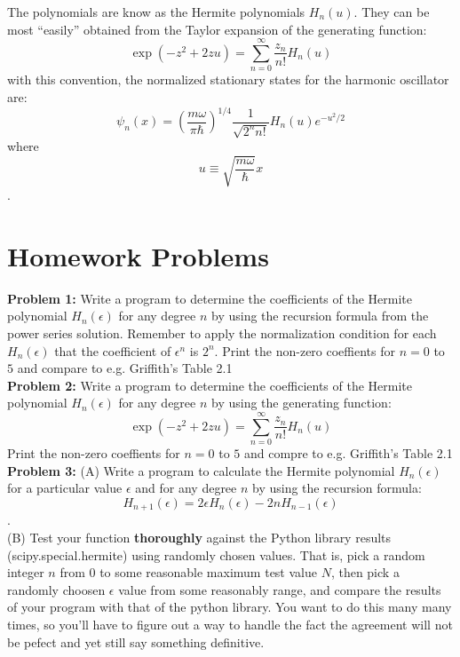 \documentclass[12pt]{book}
\begin{document}
The polynomials are know as the Hermite polynomials $H_n(u)$.  They can be most ``easily'' obtained from the Taylor expansion of the generating function:
$$\exp(-z^2+2zu) = \sum_{n=0}^{\infty} \frac{z_n}{n!}H_n(u)$$
with this convention, the normalized stationary states for the harmonic oscillator are:
$$\psi_n(x) = \left( \frac{m \omega}{\pi \hbar} \right)^{1/4} \frac{1}{\sqrt{2^n n!}}H_n(u) e^{-u^2/2}$$
where
$$u \equiv \sqrt{\frac{m \omega}{\hbar}} x$$.

\section{Homework Problems}

\noindent
{\bf Problem 1:} Write a program to determine the coefficients of the Hermite polynomial $H_n(\epsilon)$ for any degree $n$ by using the recursion formula from
the power series solution.  Remember to apply the normalization
condition for each $H_n(\epsilon)$ that the coefficient of
$\epsilon^n$ is $2^n$.  Print the non-zero coeffients for $n=0$ to $5$ and
compare to e.g. Griffith's Table 2.1\\[5pt]

\noindent
{\bf Problem 2:} Write a program to determine the coefficients of the Hermite polynomial $H_n(\epsilon)$ for any degree $n$ by using the generating function:
$$\exp(-z^2+2zu) = \sum_{n=0}^{\infty} \frac{z_n}{n!}H_n(u)$$
Print the non-zero coeffients for $n=0$ to $5$ and
compre to e.g. Griffith's Table 2.1\\[5pt]


\noindent
{\bf Problem 3:} (A) Write a program to calculate the Hermite polynomial
$H_n(\epsilon)$ for a particular value $\epsilon$ and for any degree
$n$ by using the recursion formula:
$$H_{n+1}(\epsilon) = 2 \epsilon H_n(\epsilon) - 2 n H_{n-1}(\epsilon)$$.\\

\noindent
(B) Test your function {\bf thoroughly} against the Python library results
(scipy.special.hermite) using randomly chosen values.  That is, pick a
random integer $n$ from $0$ to some reasonable maximum test value $N$, then
pick a randomly choosen $\epsilon$ value from some reasonably range,
and compare the results of your program with that of the python library.  You
want to do this many many times, so you'll have to figure out a way to
handle the fact the agreement will not be pefect and yet still say
something definitive.\\[5pt]
\end{document}
